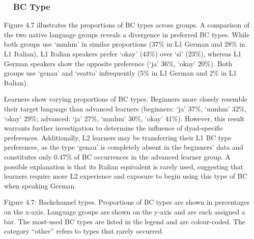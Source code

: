 \subsubsection[\ \ BC Type]{\ \ BC Type}
\hypertarget{Toc191305954}{}\begin{styleStandard}
Figure 4.7 illustrates the proportions of BC types across groups. A comparison of the two native language groups reveals a divergence in preferred BC types. While both groups use ‘mmhm’ in similar proportions (37\% in L1 German and 28\% in L1 Italian), L1 Italian speakers prefer ‘okay’ (43\%) over ‘sì’ (23\%), whereas L1 German speakers show the opposite preference (‘ja’ 36\%, ‘okay’ 20\%). Both groups use ‘genau’ and ‘esatto’ infrequently (5\% in L1 German and 2\% in L1 Italian).
\end{styleStandard}

\begin{styleStandard}
Learners show varying proportions of BC types. Beginners more closely resemble their target language than advanced learners (beginners: ‘ja’ 37\%, ‘mmhm’ 32\%, ‘okay’ 29\%; advanced: ‘ja’ 27\%, ‘mmhm’ 30\%, ‘okay’ 41\%). However, this result warrants further investigation to determine the influence of dyad-specific preferences. Additionally, L2 learners may be transferring their L1 BC type preferences, as the type ‘genau’ is completely absent in the beginners' data and constitutes only 0.47\% of BC occurrences in the advanced learner group. A possible explanation is that its Italian equivalent is rarely used, suggesting that learners require more L2 experience and exposure to begin using this type of BC when speaking German.
\end{styleStandard}

\begin{styleStandard}
  [Warning: Image ignored] %
 
\end{styleStandard}

\begin{stylecaption}
Figure 4.7: Backchannel types. Proportions of BC types are shown in percentages on the x-axis. Language groups are shown on the y-axis and are each assigned a bar. The most-used BC types are listed in the legend and are colour-coded. The category “other” refers to types that rarely occurred.
\end{stylecaption}

